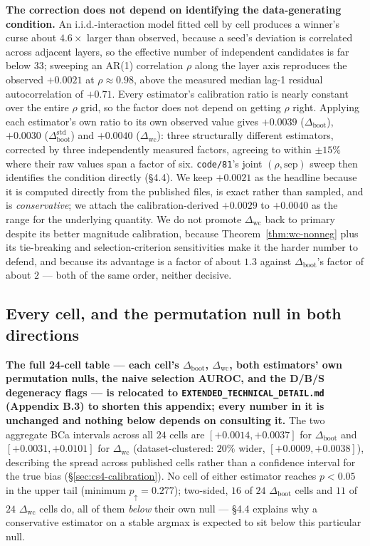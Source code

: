 \documentclass[10pt]{article} %
\begin{document}
\textbf{The correction does not depend on identifying the data-generating
condition.} An i.i.d.-interaction model fitted cell by cell produces a
winner's curse about $4.6\times$ larger than observed, because a seed's
deviation is correlated across adjacent layers, so the effective number of
independent candidates is far below $33$; sweeping an AR(1) correlation $\rho$
along the layer axis reproduces the observed $+0.0021$ at $\rho\approx0.98$,
above the measured median lag-1 residual autocorrelation of $+0.71$. Every
estimator's calibration ratio is nearly constant over the entire $\rho$ grid,
so the factor does not depend on getting $\rho$ right. Applying each
estimator's own ratio to its own observed value gives $+0.0039$
($\Delta_{\text{boot}}$), $+0.0030$ ($\Delta_{\text{boot}}^{\text{std}}$) and
$+0.0040$ ($\Delta_{\text{wc}}$): three structurally different estimators,
corrected by three independently measured factors, agreeing to within $\pm15\%$
where their raw values span a factor of six. \texttt{code/81}'s joint
$(\rho,\text{sep})$ sweep then identifies the condition directly (§4.4). We
keep $+0.0021$ as the headline because it is computed directly from the
published files, is exact rather than sampled, and is \emph{conservative}; we
attach the calibration-derived $+0.0029$ to $+0.0040$ as the range for the
underlying quantity. We do not promote $\Delta_{\text{wc}}$ back to primary
despite its better magnitude calibration, because Theorem~\ref{thm:wc-nonneg}
plus its tie-breaking and selection-criterion sensitivities make it the harder
number to defend, and because its advantage is a factor of about $1.3$ against
$\Delta_{\text{boot}}$'s factor of about $2$ --- both of the same order,
neither decisive.

\subsection{Every cell, and the permutation null in both directions}
\label{sec:cs4-percell}

\textbf{The full 24-cell table --- each cell's $\Delta_{\text{boot}}$,
$\Delta_{\text{wc}}$, both estimators' own permutation nulls, the naive
selection AUROC, and the D/B/S degeneracy flags --- is relocated to
\texttt{EXTENDED\_TECHNICAL\_DETAIL.md} (Appendix B.3) to shorten this
appendix; every number in it is unchanged and nothing below depends on
consulting it.} The two aggregate BCa intervals across all $24$ cells are
$[+0.0014,+0.0037]$ for $\Delta_{\text{boot}}$ and $[+0.0031,+0.0101]$ for
$\Delta_{\text{wc}}$ (dataset-clustered: $20\%$ wider, $[+0.0009,+0.0038]$),
describing the spread across published cells rather than a confidence
interval for the true bias (§\ref{sec:cs4-calibration}). No cell of either
estimator reaches $p<0.05$ in the upper tail (minimum $p_{\uparrow}=0.277$);
two-sided, $16$ of $24$ $\Delta_{\text{boot}}$ cells and $11$ of $24$
$\Delta_{\text{wc}}$ cells do, all of them \emph{below} their own null --- §4.4
explains why a conservative estimator on a stable argmax is expected to sit
below this particular null.
\end{document}
